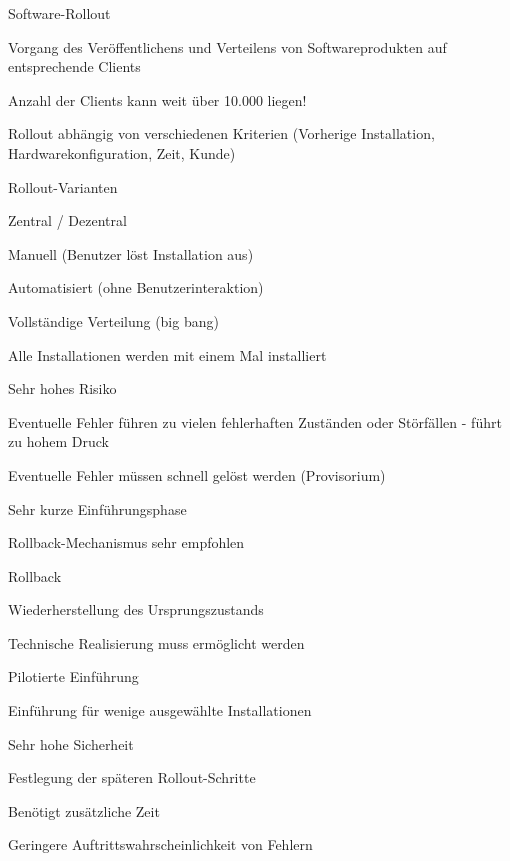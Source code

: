 \documentclass[a4paper]{article}
\begin{document}
\begin{multicols}{3}
  Software-Rollout
  \begin{itemize*}
    \item Vorgang des Veröffentlichens und Verteilens von Softwareprodukten auf entsprechende Clients
    \item Anzahl der Clients kann weit über 10.000 liegen!
    \item Rollout abhängig von verschiedenen Kriterien (Vorherige Installation, Hardwarekonfiguration, Zeit, Kunde)
    \item Rollout-Varianten
          \begin{itemize*}
            \item Zentral / Dezentral
            \item Manuell (Benutzer löst Installation aus)
            \item Automatisiert (ohne Benutzerinteraktion)
          \end{itemize*}
  \end{itemize*}

  Vollständige Verteilung (big bang)
  \begin{itemize*}
    \item Alle Installationen werden mit einem Mal installiert
    \item Sehr hohes Risiko
    \item Eventuelle Fehler führen zu vielen fehlerhaften Zuständen oder Störfällen - führt zu hohem Druck
    \item Eventuelle Fehler müssen schnell gelöst werden (Provisorium)
    \item Sehr kurze Einführungsphase
    \item Rollback-Mechanismus sehr empfohlen
  \end{itemize*}

  Rollback
  \begin{itemize*}
    \item Wiederherstellung des Ursprungszustands
    \item Technische Realisierung muss ermöglicht werden
  \end{itemize*}

  Pilotierte Einführung
  \begin{itemize*}
    \item Einführung für wenige ausgewählte Installationen
    \item Sehr hohe Sicherheit
    \item Festlegung der späteren Rollout-Schritte
    \item Benötigt zusätzliche Zeit
    \item Geringere Auftrittswahrscheinlichkeit von Fehlern
  \end{itemize*}


\end{multicols}
\end{document}
